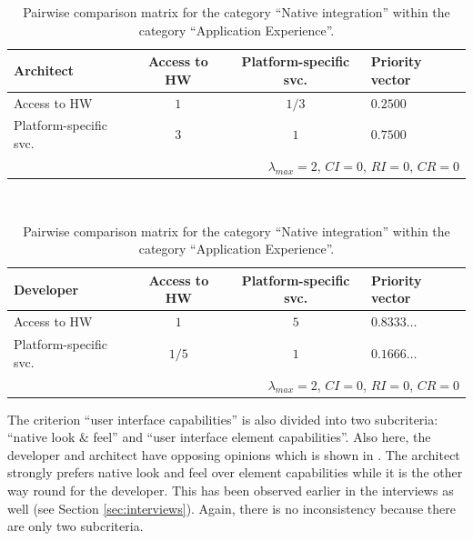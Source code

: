 \begin{table}[h!]
    \centering
    \begin{tabular}{lccl}
        \hline
        \textbf{Architect}     & Access to HW & Platform-specific svc. & Priority vector \\
        \hline
        Access to HW           & $1$          & $1/3$                  & $0.2500$        \\
        Platform-specific svc. & $3$          & $1$                    & $0.7500$        \\
        \hline
        \multicolumn{4}{r}{$\lambda_{max} = 2$, $CI = 0$, $RI = 0$, $CR = 0$}            \\
        \hline
    \end{tabular}
    \\\vspace{1em}
    \begin{tabular}{lccl}
        \hline
        \textbf{Developer}     & Access to HW & Platform-specific svc. & Priority vector \\
        \hline
        Access to HW           & $1$          & $5$                    & $0.8333\ldots$  \\
        Platform-specific svc. & $1/5$        & $1$                    & $0.1666\ldots$  \\
        \hline
        \multicolumn{4}{r}{$\lambda_{max} = 2$, $CI = 0$, $RI = 0$, $CR = 0$}            \\
        \hline
    \end{tabular}
    \caption{Pairwise comparison matrix for the category ``Native integration'' within the category ``Application Experience''.}
    \label{tab:ni}
\end{table}

The criterion ``user interface capabilities'' is also divided into two subcriteria: ``native look \& feel'' and ``user interface element capabilities''. Also here, the developer and architect have opposing opinions which is shown in . The architect strongly prefers native look and feel over element capabilities while it is the other way round for the developer. This has been observed earlier in the interviews as well (see Section \ref{sec:interviews}). Again, there is no inconsistency because there are only two subcriteria.

